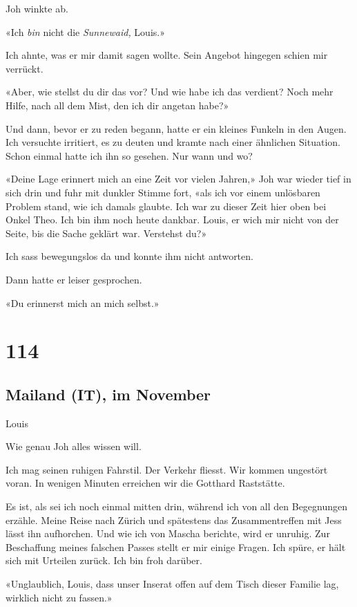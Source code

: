 Joh winkte ab.

«Ich \emph{bin} nicht die \emph{Sunnewaid,} Louis.»

Ich ahnte, was er mir damit sagen wollte. Sein Angebot hingegen schien
mir verrückt.

«Aber, wie stellst du dir das vor? Und wie habe ich das verdient? Noch
mehr Hilfe, nach all dem Mist, den ich dir angetan habe?»

Und dann, bevor er zu reden begann, hatte er ein kleines Funkeln in den
Augen. Ich versuchte irritiert, es zu deuten und kramte nach einer
ähnlichen Situation. Schon einmal hatte ich ihn so gesehen. Nur wann und
wo?

«Deine Lage erinnert mich an eine Zeit vor vielen Jahren,» Joh war
wieder tief in sich drin und fuhr mit dunkler Stimme fort, «als ich vor
einem unlösbaren Problem stand, wie ich damals glaubte. Ich war zu
dieser Zeit hier oben bei Onkel Theo. Ich bin ihm noch heute dankbar.
Louis, er wich mir nicht von der Seite, bis die Sache geklärt war.
Verstehst du?»

Ich sass bewegungslos da und konnte ihm nicht antworten.

Dann hatte er leiser gesprochen.

«Du erinnerst mich an mich selbst.»

\chapter{114}\label{section-114}

\section{Mailand (IT), im November}\label{mailand-it-im-november}

Louis

Wie genau Joh alles wissen will.

Ich mag seinen ruhigen Fahrstil. Der Verkehr fliesst. Wir kommen
ungestört voran. In wenigen Minuten erreichen wir die Gotthard
Raststätte.

Es ist, als sei ich noch einmal mitten drin, während ich von all den
Begegnungen erzähle. Meine Reise nach Zürich und spätestens das
Zusammentreffen mit Jess lässt ihn aufhorchen. Und wie ich von Mascha
berichte, wird er unruhig. Zur Beschaffung meines falschen Passes stellt
er mir einige Fragen. Ich spüre, er hält sich mit Urteilen zurück. Ich
bin froh darüber.

«Unglaublich, Louis, dass unser Inserat offen auf dem Tisch dieser
Familie lag, wirklich nicht zu fassen.»

